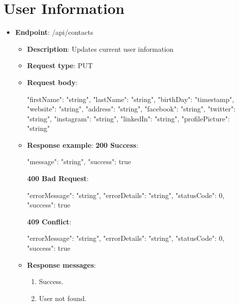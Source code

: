 \section{User Information}\label{sec:user-information}
\begin{itemize}
    \item \textbf{Endpoint}: /api/contacts
    \begin{itemize}
        \item \textbf{Description}: Updates current user information
        \item \textbf{Request type}: PUT
        \item \textbf{Request body}:
        \begin{spverbatim}
        {
            "firstName": "string",
            "lastName": "string",
            "birthDay": "timestamp",
            "website": "string",
            "address": "string",
            "facebook": "string",
            "twitter": "string",
            "instagram": "string",
            "linkedIn": "string",
            "profilePicture": "string"
        }
        \end{spverbatim}
        \item \textbf{Response example}:
        \textbf{200 Success}:
        \begin{spverbatim}
        {
            "message": "string",
            "success": true
        }
        \end{spverbatim}
        \textbf{400 Bad Request}:
        \begin{spverbatim}
        {
            "errorMessage": "string",
            "errorDetails": "string",
            "statusCode": 0,
            "success": true
        }
        \end{spverbatim}
        \textbf{409 Conflict}:
        \begin{spverbatim}
        {
            "errorMessage": "string",
            "errorDetails": "string",
            "statusCode": 0,
            "success": true
        }
        \end{spverbatim}
        \item \textbf{Response messages}:
        \begin{enumerate}
            \item Success.
            \item User not found.
        \end{enumerate}
    \end{itemize}
\end{itemize}